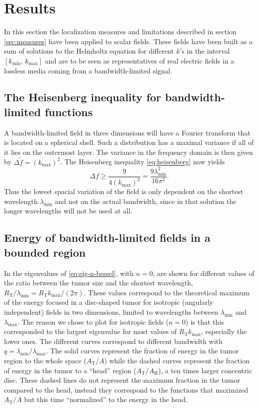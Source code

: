 \documentclass[11pt,a4paper, 
swedish,english %
]{article}
\newcommand{\RT}{\ensuremath{R_{\text{T}}}}
\newcommand{\tf}{\ensuremath{\tilde{f}}}
\begin{document}
\section{Results}
In this section the localization measures and limitations described in 
section \ref{sec:measures} have been applied to scalar fields. These 
fields have been built as a sum of solutions to the Helmholtz equation for 
different $k$'s in the interval $[k_{\min},\,k_{\max}]$ and are to be 
seen as representatives of real electric fields in a lossless media 
coming from a bandwidth-limited signal.


\subsection{The Heisenberg inequality for bandwidth-limited functions}
\label{sec:Heisenberg_result}
A bandwidth-limited field in three dimensions will have a Fourier transform that is located on a spherical
shell. Such a distribution has a maximal variance if all of it lies on the outermost layer. The variance
in the frequency domain is then given by $\Delta \tf=(k_{\max})^2$. The Heisenberg inequality \eqref{eq:heisenberg}
now yields
\begin{equation}
\Delta f \geq \frac{9}{4(k_{\max})^2}=\frac{9\lambda_{\min}^2}{16\pi^2}.
\end{equation}
Thus the lowest spacial variation of the field is only dependent on the shortest wavelength $\lambda_{\min}$
and not on the actual bandwidth, since in that solution the longer wavelengths will not be used at all.

\subsection{Energy of bandwidth-limited fields in a bounded region}

In  the eigenvalues of \eqref{eq:eig-n-bessel}, with $n=0$, are shown 
for different values of the ratio between the tumor size and the
shortest wavelength, $\RT/\lambda_{\min}=\RT{k_{\max}}/(2\pi)$. 
These values correspond to the theoretical maximum of the energy focused in a
disc-shaped tumor for isotropic (angularly independent) fields in two
dimensions, limited to wavelengths between $\lambda_{\min}$ and
$\lambda_{\max}$. 
The reason we chose to plot for isotropic fields ($n=0$) is that this
corresponded to the largest eigenvalue for most values of $\RT
k_{\max}$, especially the lower ones. 
The different curves correspond to different bandwidth with
$q=\lambda_{\min}/\lambda_{\max}$. The solid curves represent the
fraction of energy in the tumor region to the whole space
($A_\text{T}/A$) while the dashed curves represent the fraction of
energy in the tumor to a ``head'' region ($A_\text{T}/A_\text{H}$), a
ten times larger concentric disc. These dashed lines do not represent
the maximum fraction in the tumor compared to the head, instead they
correspond to the functions that maximized $A_\text{T}/A$ but this
time ``normalized''  to the energy in the head. 
\end{document}
